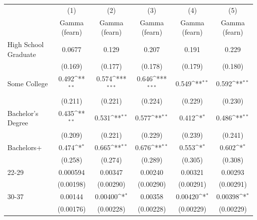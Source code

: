{
\def\sym#1{\ifmmode^{#1}\else\(^{#1}\)\fi}
\begin{tabular}{l*{5}{c}}
\hline\hline
                    &\multicolumn{1}{c}{(1)}&\multicolumn{1}{c}{(2)}&\multicolumn{1}{c}{(3)}&\multicolumn{1}{c}{(4)}&\multicolumn{1}{c}{(5)}\\
                    &\multicolumn{1}{c}{Gamma (fearn)}&\multicolumn{1}{c}{Gamma (fearn)}&\multicolumn{1}{c}{Gamma (fearn)}&\multicolumn{1}{c}{Gamma (fearn)}&\multicolumn{1}{c}{Gamma (fearn)}\\
\hline
High School Graduate&      0.0677         &       0.129         &       0.207         &       0.191         &       0.229         \\
                    &     (0.169)         &     (0.177)         &     (0.178)         &     (0.179)         &     (0.180)         \\
[1em]
Some College        &       0.492\sym{**} &       0.574\sym{***}&       0.646\sym{***}&       0.549\sym{**} &       0.592\sym{**} \\
                    &     (0.211)         &     (0.221)         &     (0.224)         &     (0.229)         &     (0.230)         \\
[1em]
Bachelor's Degree   &       0.435\sym{**} &       0.531\sym{**} &       0.577\sym{**} &       0.412\sym{*}  &       0.486\sym{**} \\
                    &     (0.209)         &     (0.221)         &     (0.229)         &     (0.239)         &     (0.241)         \\
[1em]
Bachelors+          &       0.474\sym{*}  &       0.665\sym{**} &       0.676\sym{**} &       0.553\sym{*}  &       0.602\sym{*}  \\
                    &     (0.258)         &     (0.274)         &     (0.289)         &     (0.305)         &     (0.308)         \\
[1em]
22-29               &    0.000594         &     0.00347         &     0.00240         &     0.00321         &     0.00293         \\
                    &   (0.00198)         &   (0.00290)         &   (0.00290)         &   (0.00291)         &   (0.00291)         \\
[1em]
30-37               &     0.00144         &     0.00400\sym{*}  &     0.00358         &     0.00420\sym{*}  &     0.00398\sym{*}  \\
                    &   (0.00176)         &   (0.00228)         &   (0.00228)         &   (0.00229)         &   (0.00229)         \\

\end{tabular}}

